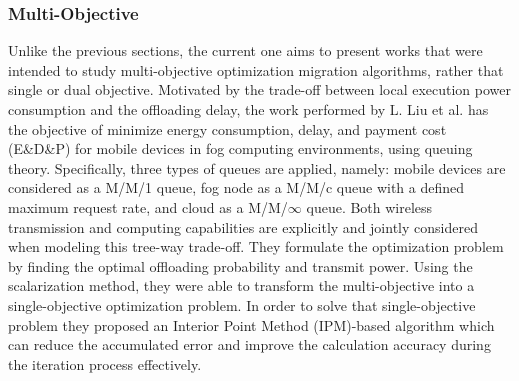\subsubsection{Multi-Objective}\label{sec:multi}
Unlike the previous sections, the current one aims to present works that were intended to study multi-objective optimization migration algorithms, rather that single or dual objective.
\noindent\tab Motivated by the trade-off between local execution power consumption and the offloading delay, the work performed by L. Liu et al. \cite{liu2018multiobjective} has the objective of minimize energy consumption, delay, and payment cost (E\&D\&P) for mobile devices in fog computing environments, using queuing theory. Specifically, three types of queues are applied, namely: mobile devices are considered as a M/M/1 queue, fog node as a M/M/c queue with a defined maximum request rate, and cloud as a M/M/$\infty$ queue. Both wireless transmission and computing capabilities are explicitly and jointly considered when modeling this tree-way trade-off. They formulate the optimization problem by finding the optimal offloading probability and transmit power. Using the scalarization method, they were able to transform the multi-objective into a single-objective optimization problem. In order to solve that single-objective problem they proposed an Interior Point Method (IPM)-based algorithm which can reduce the accumulated error and improve the calculation accuracy during the iteration process effectively.\\
